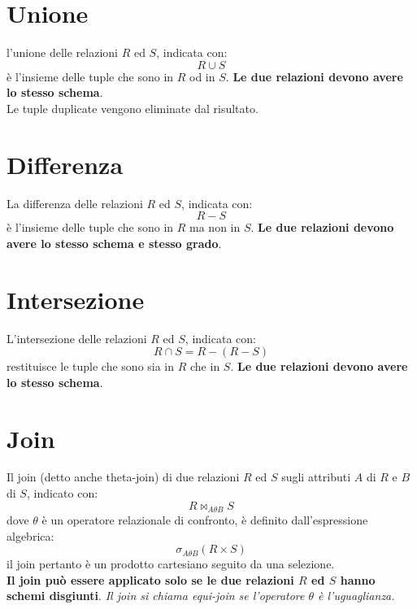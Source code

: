 \documentclass[12pt, a4paper]{report}
\begin{document}
    \section{Unione}
    l'unione delle relazioni $R$ ed $S$, indicata con:
    \begin{equation*}
        R \cup S
    \end{equation*}
    è l'insieme delle tuple che sono in $R$ od in $S$. \textbf{Le due relazioni devono avere lo stesso schema}.\\
    Le tuple duplicate vengono eliminate dal risultato.
    \section{Differenza}
    La differenza delle relazioni $R$ ed $S$, indicata con:
    \begin{equation*}
        R - S
    \end{equation*}
    è l'insieme delle tuple che sono in $R$ ma non in $S$. \textbf{Le due relazioni devono avere lo stesso schema e stesso grado}.
    \section{Intersezione}
    L'intersezione delle relazioni $R$ ed $S$, indicata con:
    \begin{equation*}
        R \cap S = R - (R - S)
    \end{equation*}
    restituisce le tuple che sono sia in $R$ che in $S$. \textbf{Le due relazioni devono avere lo stesso schema}.
    \section{Join}
    Il join (detto anche theta-join) di due relazioni $R$ ed $S$ sugli attributi $A$ di $R$ e $B$ di $S$, indicato con:
    \begin{equation*}
        R \bowtie_{A\theta B} S
    \end{equation*}
    dove $\theta$ è un operatore relazionale di confronto, è definito dall'espressione algebrica:
    \begin{equation*}
        \sigma_{A\theta B}(R \times S)
    \end{equation*}
    il join pertanto è un prodotto cartesiano seguito da una selezione. \\
    \textbf{Il join può essere applicato solo se le due relazioni $R$ ed $S$ hanno schemi disgiunti}.
    \textit{Il join si chiama equi-join se l'operatore $\theta$ è l'uguaglianza.}
\end{document}
